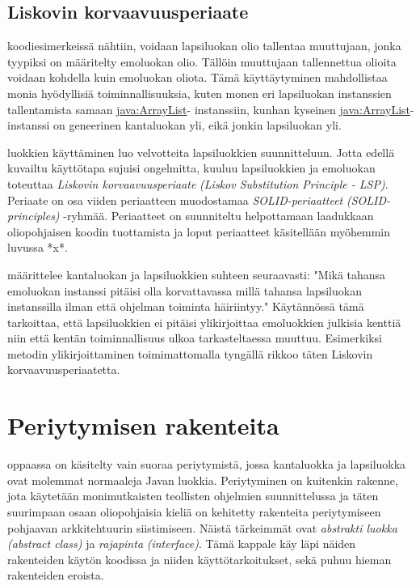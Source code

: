 \documentclass{tufte-book}
\newcommand{\eng}[1]{\textit{(#1)}}
\newcommand{\new}[1]{\textit{\gls{#1}}}
\newcommand{\neweng}[2]{\new{#1} \eng{#2}}
\newcommand{\java}[1]{\underline{\gls{java:#1}}}
\begin{document}
\subsection{Liskovin korvaavuusperiaate}
\label{liskov1}

  koodiesimerkeissä nähtiin, voidaan lapsiluokan olio
tallentaa muuttujaan, jonka tyypiksi on määritelty emoluokan olio. Tällöin muuttujaan tallennettua
olioita voidaan kohdella kuin emoluokan oliota. Tämä käyttäytyminen mahdollistaa monia hyödyllisiä
toiminnallisuuksia, kuten monen eri lapsiluokan instanssien tallentamista samaan \java{ArrayList}-
instanssiin, kunhan kyseinen \java{ArrayList}-instanssi on geneerinen kantaluokan yli, eikä
jonkin lapsiluokan yli.

 luokkien käyttäminen luo velvotteita lapsiluokkien suunnitteluun.
Jotta edellä kuvailtu käyttötapa sujuisi ongelmitta, kuuluu lapsiluokkien ja emoluokan toteuttaa
\neweng{Liskovin korvaavuusperiaate}{Liskov Substitution Principle - LSP}. Periaate on osa
viiden periaatteen muodostamaa \neweng{SOLID-periaatteet}{SOLID-principles} -ryhmää. Periaatteet
on suunniteltu helpottamaan laadukkaan oliopohjaisen koodin tuottamista ja loput periaatteet
käsitellään myöhemmin luvussa *x*. %

 määrittelee kantaluokan ja lapsiluokkien suhteen
seuraavasti: "Mikä tahansa emoluokan instanssi pitäisi olla korvattavassa millä tahansa 
lapsiluokan instanssilla ilman että ohjelman toiminta häiriintyy." Käytännössä tämä tarkoittaa,
että lapsiluokkien ei pitäisi ylikirjoittaa emoluokkien julkisia kenttiä niin että kentän
toiminnallisuus ulkoa tarkasteltaessa muuttuu. Esimerkiksi metodin ylikirjoittaminen
toimimattomalla tyngällä rikkoo täten Liskovin korvaavuusperiaatetta.


\section{Periytymisen rakenteita}
\label{periytyminen5}

 oppaassa on käsitelty vain suoraa periytymistä, jossa
\gls{kantaluokka} ja \gls{lapsiluokka} ovat molemmat normaaleja Javan luokkia. Periytyminen on
kuitenkin rakenne, jota käytetään monimutkaisten teollisten ohjelmien suunnittelussa ja täten
suurimpaan osaan oliopohjaisia kieliä on kehitetty rakenteita periytymiseen pohjaavan
arkkitehtuurin siistimiseen. Näistä tärkeimmät ovat \neweng{abstrakti luokka}{abstract class} ja
\neweng{rajapinta}{interface}. Tämä kappale käy läpi näiden rakenteiden käytön koodissa ja niiden
käyttötarkoitukset, sekä puhuu hieman rakenteiden eroista.
\end{document}
